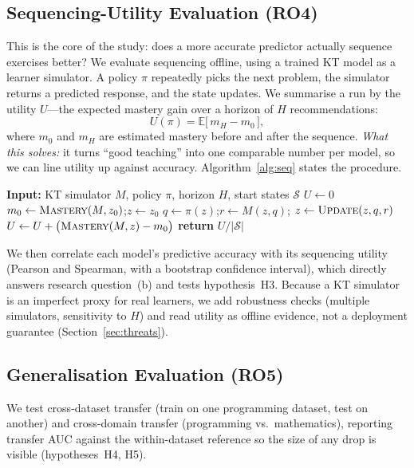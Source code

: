 \subsection{Sequencing-Utility Evaluation (RO4)}
\label{sec:sequencing}
This is the core of the study: does a more accurate predictor actually
sequence exercises better? We evaluate sequencing offline, using a
trained KT model as a learner simulator. A policy $\pi$ repeatedly picks
the next problem, the simulator returns a predicted response, and the
state updates. We summarise a run by the utility $U$---the expected
mastery gain over a horizon of $H$ recommendations:
\begin{equation}
U(\pi) = \mathbb{E}\big[\, m_{H} - m_{0} \,\big],
\label{eq:utility}
\end{equation}
where $m_0$ and $m_H$ are estimated mastery before and after the
sequence. \emph{What this solves:} it turns ``good teaching'' into one
comparable number per model, so we can line utility up against accuracy.
Algorithm~\ref{alg:seq} states the procedure.

\begin{algorithm}[t]
\caption{Offline sequencing-utility evaluation}
\label{alg:seq}
\begin{algorithmic}[1]
\STATE \textbf{Input:} KT simulator $M$, policy $\pi$, horizon $H$,
       start states $\mathcal{S}$
\STATE $U \gets 0$
  \STATE $m_0 \gets \textsc{Mastery}(M, z_0)$;\quad $z \gets z_0$
    \STATE $q \gets \pi(z)$;\quad $r \gets M(z, q)$;\quad
           $z \gets \textsc{Update}(z, q, r)$
  \ENDFOR
  \STATE $U \gets U + \big(\textsc{Mastery}(M, z) - m_0\big)$
\ENDFOR
\STATE \textbf{return} $U / |\mathcal{S}|$
\end{algorithmic}
\end{algorithm}

We then correlate each model's predictive accuracy with its sequencing
utility (Pearson and Spearman, with a bootstrap confidence interval),
which directly answers research question~(b) and tests hypothesis~H3.
Because a KT simulator is an imperfect proxy for real learners, we add
robustness checks (multiple simulators, sensitivity to $H$) and read
utility as offline evidence, not a deployment guarantee
(Section~\ref{sec:threats}).

\subsection{Generalisation Evaluation (RO5)}
\label{sec:gen-eval}
We test cross-dataset transfer (train on one programming dataset, test on
another) and cross-domain transfer (programming vs.\ mathematics),
reporting transfer AUC against the within-dataset reference so the size of
any drop is visible (hypotheses~H4, H5).
